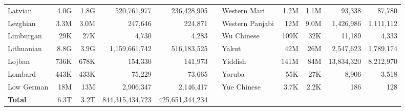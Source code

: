 \begin{table*}[t!]
\begin{tabular}{lrrrrclrrrr}
        Latvian                   & 4.0G                     & 1.8G                      & 520,761,977              & 236,428,905               &                          & Western Mari              & 1.2M                     & 1.1M                      & 93,338                   & 87,780                    \\
        Lezghian                  & 3.3M                     & 3.0M                      & 247,646                  & 224,871                   &                          & Western Panjabi           & 12M                      & 9.0M                      & 1,426,986                & 1,111,112                 \\
        Limburgan                 & 29K                      & 27K                       & 4,730                    & 4,283                     &                          & Wu Chinese                & 109K                     & 32K                       & 11,189                   & 4,333                     \\
        Lithuanian                & 8.8G                     & 3.9G                      & 1,159,661,742            & 516,183,525               &                          & Yakut                     & 42M                      & 26M                       & 2,547,623                & 1,789,174                 \\
        Lojban                    & 736K                     & 678K                      & 154,330                  & 141,973                   &                          & Yiddish                   & 141M                     & 84M                       & 13,834,320               & 8,212,970                 \\
        Lombard                   & 443K                     & 433K                      & 75,229                   & 73,665                    &                          & Yoruba                    & 55K                      & 27K                       & 8,906                    & 3,518                     \\
        Low German                & 18M                      & 13M                       & 2,906,347                & 2,146,417                 &                          & Yue Chinese               & 3.7K                     & 2.2K                      & 186                      & 128                       \\
        \midrule
        \textbf{Total}            & 6.3T                     & 3.2T                      & 844,315,434,723          & 425,651,344,234           &                          &                           &                          &                           &                          &                           \\

\end{tabular}
\end{table*}
